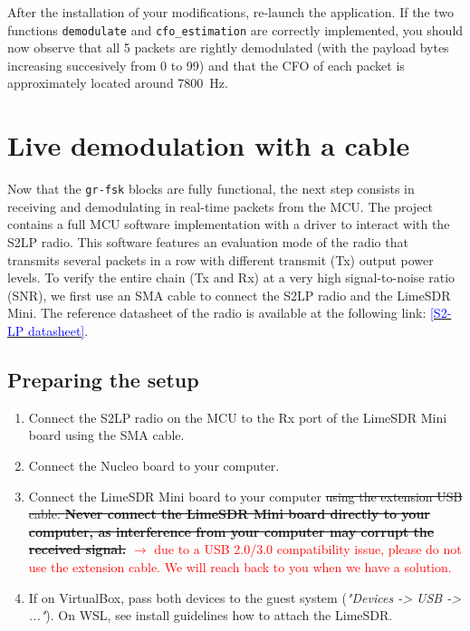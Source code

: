 After the installation of your modifications, re-launch the application.
If the two functions \texttt{demodulate} and \texttt{cfo\_estimation} are correctly implemented, you should now observe that all 5 packets are rightly demodulated (with the payload bytes increasing succesively from 0 to 99)
and that the CFO of each packet is approximately located around \SI{7800}{\hertz}.

\section{Live demodulation with a cable}

Now that the \texttt{gr-fsk} blocks are fully functional, the next step consists in receiving and demodulating in real-time packets from the MCU.
The project contains a full MCU software implementation with a driver to interact with the S2LP radio.
This software features an evaluation mode of the radio that transmits several packets in a row with different transmit (Tx) output power levels.
To verify the entire chain (Tx and Rx) at a very high signal-to-noise ratio (SNR), we first use an SMA cable to connect the S2LP radio and the LimeSDR Mini.
The reference datasheet of the radio is available at the following link: \href{https://www.st.com/resource/en/datasheet/s2-lp.pdf}{\textcolor{blue}{[S2-LP datasheet]}}.

\subsection{Preparing the setup}

\begin{enumerate}
    \item Connect the S2LP radio on the MCU to the Rx port of the LimeSDR Mini board using the SMA cable.
    \item Connect the Nucleo board to your computer.
    \item Connect the LimeSDR Mini board to your computer \st{using the extension USB cable.
        \textbf{Never connect the LimeSDR Mini board directly to your computer, as interference from your computer may corrupt the received signal.}} \textcolor{red}{$\rightarrow$ due to a USB 2.0/3.0 compatibility issue, please do not use the extension cable. We will reach back to you when we have a solution.}
    \item If on VirtualBox, pass both devices to the guest system (\textit{"Devices -> USB -> ..."}). On WSL, see install guidelines how to attach the LimeSDR.
\end{enumerate}

